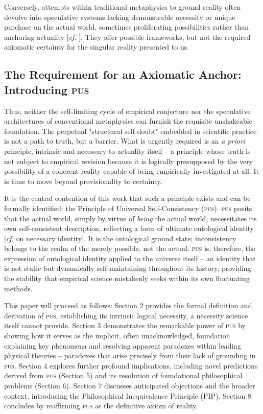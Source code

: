 \documentclass[11pt, a4paper]{article}
\newcommand{\pus}{\textsc{pus}} %
\begin{document}
Conversely, attempts within traditional metaphysics to ground reality often devolve into speculative systems lacking demonstrable necessity or unique purchase on the actual world, sometimes proliferating possibilities rather than anchoring actuality [\textit{cf.} \citealp{lewis1986}]. They offer possible frameworks, but not the required axiomatic certainty for the singular reality presented to us.

\subsection{The Requirement for an Axiomatic Anchor: Introducing \pus}
Thus, neither the self-limiting cycle of empirical conjecture nor the speculative architectures of conventional metaphysics can furnish the requisite unshakeable foundation. The perpetual "structural self-doubt" embedded in scientific practice is not a path to truth, but a barrier. What is urgently required is an \textit{a priori} principle, intrinsic and necessary to actuality itself – a principle whose truth is not subject to empirical revision because it is logically presupposed by the very possibility of a coherent reality capable of being empirically investigated at all. It is time to move beyond provisionality to certainty.

It is the central contention of this work that such a principle exists and can be formally identified: the Principle of Universal Self-Consistency (\pus). \pus{} posits that the actual world, simply by virtue of \textit{being} the actual world, necessitates its own self-consistent description, reflecting a form of ultimate ontological identity [\textit{cf.} \citealp{kripke1980} on necessary identity]. It is the ontological ground state; inconsistency belongs to the realm of the merely possible, not the actual. \pus{} is, therefore, the expression of ontological identity applied to the universe itself – an identity that is not static but dynamically self-maintaining throughout its history, providing the stability that empirical science mistakenly seeks within its own fluctuating methods.

This paper will proceed as follows: Section 2 provides the formal definition and derivation of \pus, establishing its intrinsic logical necessity, a necessity science itself cannot provide. Section 3 demonstrates the remarkable power of \pus{} by showing how it serves as the implicit, often unacknowledged, foundation explaining key phenomena and resolving apparent paradoxes within leading physical theories – paradoxes that arise precisely from their lack of grounding in \pus. Section 4 explores further profound implications, including novel predictions derived from \pus{} (Section 5) and its resolution of foundational philosophical problems (Section 6). Section 7 discusses anticipated objections and the broader context, introducing the Philosophical Inequivalence Principle (PIP). Section 8 concludes by reaffirming \pus{} as the definitive axiom of reality.
\end{document}
